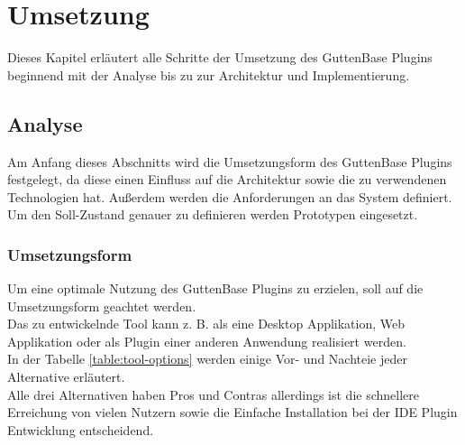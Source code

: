 \chapter{Umsetzung}
Dieses Kapitel erläutert alle Schritte der Umsetzung des GuttenBase Plugins beginnend mit der Analyse bis zu zur Architektur und Implementierung.
\section{Analyse}
Am Anfang dieses Abschnitts wird die Umsetzungsform des GuttenBase Plugins festgelegt, da diese einen Einfluss auf die Architektur sowie die zu verwendenen Technologien hat. Außerdem werden die Anforderungen an das System definiert.\\
Um den Soll-Zustand genauer zu definieren werden Prototypen eingesetzt.
\subsection{Umsetzungsform}
Um eine optimale Nutzung des GuttenBase Plugins zu erzielen, soll auf die Umsetzungsform geachtet werden.\\
Das zu entwickelnde Tool kann z. B. als eine Desktop Applikation, Web Applikation oder als Plugin einer anderen Anwendung realisiert werden.\\
In der Tabelle \ref{table:tool-options} werden einige Vor- und Nachteie jeder Alternative erläutert. \\
Alle drei Alternativen haben Pros und Contras allerdings ist die schnellere Erreichung von vielen Nutzern sowie die Einfache Installation bei der IDE Plugin Entwicklung entscheidend. 
